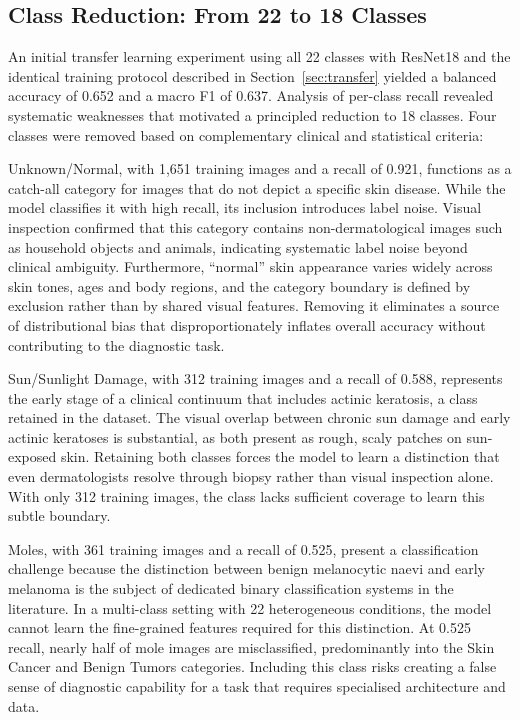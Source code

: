 \documentclass[11pt,a4paper]{article}
\begin{document}
\subsection{Class Reduction: From 22 to 18 Classes}
\label{sec:class-reduction}

An initial transfer learning experiment using all 22 classes with ResNet18 and the identical training protocol described in Section~\ref{sec:transfer} yielded a balanced accuracy of 0.652 and a macro F1 of 0.637. Analysis of per-class recall revealed systematic weaknesses that motivated a principled reduction to 18 classes. Four classes were removed based on complementary clinical and statistical criteria:

Unknown/Normal, with 1,651 training images and a recall of 0.921, functions as a catch-all category for images that do not depict a specific skin disease. While the model classifies it with high recall, its inclusion introduces label noise. Visual inspection confirmed that this category contains non-dermatological images such as household objects and animals, indicating systematic label noise beyond clinical ambiguity. Furthermore, ``normal'' skin appearance varies widely across skin tones, ages and body regions, and the category boundary is defined by exclusion rather than by shared visual features. Removing it eliminates a source of distributional bias that disproportionately inflates overall accuracy without contributing to the diagnostic task.

Sun/Sunlight Damage, with 312 training images and a recall of 0.588, represents the early stage of a clinical continuum that includes actinic keratosis, a class retained in the dataset. The visual overlap between chronic sun damage and early actinic keratoses is substantial, as both present as rough, scaly patches on sun-exposed skin. Retaining both classes forces the model to learn a distinction that even dermatologists resolve through biopsy rather than visual inspection alone. With only 312 training images, the class lacks sufficient coverage to learn this subtle boundary.

Moles, with 361 training images and a recall of 0.525, present a classification challenge because the distinction between benign melanocytic naevi and early melanoma is the subject of dedicated binary classification systems in the literature. In a multi-class setting with 22 heterogeneous conditions, the model cannot learn the fine-grained features required for this distinction. At 0.525 recall, nearly half of mole images are misclassified, predominantly into the Skin Cancer and Benign Tumors categories. Including this class risks creating a false sense of diagnostic capability for a task that requires specialised architecture and data.
\end{document}
